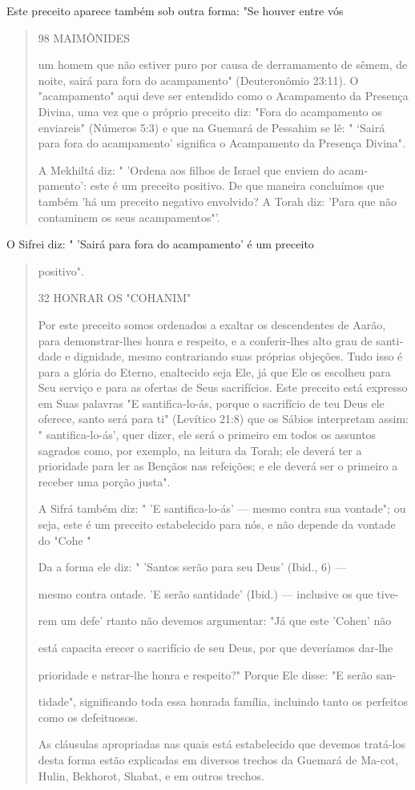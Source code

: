 Este preceito aparece também sob outra forma: "Se houver entre vós

\begin{quote}
98 MAIMÔNIDES

um homem que não estiver puro por causa de derramamento de sêmem, de
noite, sairá para fora do acampamento" (Deuteronômio 23:11). O
"acampamen­to" aqui deve ser entendido como o Acampamento da Presença
Divina, uma vez que o próprio preceito diz: "Fora do acampamento os
enviareis" (Núme­ros 5:3) e que na Guemará de Pessahim se lê: " `Sairá
para fora do acampamen­to' significa o Acampamento da Presença Divina".

A Mekhiltá diz: " 'Ordena aos filhos de Israel que enviem do
acam­pamento': este é um preceito positivo. De que maneira concluímos
que tam­bém 'há um preceito negativo envolvido? A Torah diz: 'Para que
não contami­nem os seus acampamentos"'.
\end{quote}

O Sifrei diz: " 'Sairá para fora do acampamento' é um preceito

\begin{quote}
positivo".

32 HONRAR OS "COHANIM"

Por este preceito somos ordenados a exaltar os descendentes de Aa­rão,
para demonstrar-lhes honra e respeito, e a conferir-lhes alto grau de
santi­dade e dignidade, mesmo contrariando suas próprias objeções. Tudo
isso é pa­ra a glória do Eterno, enaltecido seja Ele, já que Ele os
escolheu para Seu servi­ço e para as ofertas de Seus sacrifícios. Este
preceito está expresso em Suas pa­lavras "E santifica-lo-ás, porque o
sacrifício de teu Deus ele oferece, santo será para ti" (Levítico 21:8)
que os Sábios interpretam assim: " santifica-lo-ás', quer dizer, ele
será o primeiro em todos os assuntos sagrados como, por exemplo, na
leitura da Torah; ele deverá ter a prioridade para ler as Bençãos nas
refei­ções; e ele deverá ser o primeiro a receber uma porção justa".

A Sifrá também diz: " 'E santifica-lo-ás' --- mesmo contra sua
vonta­de"; ou seja, este é um preceito estabelecido para nós, e não
depende da von­tade do "Cohe "

Da a forma ele diz: " 'Santos serão para seu Deus' (Ibid., 6) ---

mesmo contra ontade. 'E serão santidade' (Ibid.) --- inclusive os que
tive-

rem um defe' rtanto não devemos argumentar: "Já que este 'Cohen' não

está capacita erecer o sacrifício de seu Deus, por que deveríamos
dar-lhe

prioridade e nstrar-lhe honra e respeito?" Porque Ele disse: "E serão
san-

tidade", significando toda essa honrada família, incluindo tanto os
perfeitos co­mo os defeituosos.

As cláusulas apropriadas nas quais está estabelecido que devemos
tratá-los desta forma estão explicadas em diversos trechos da Guemará de
Ma-cot, Hulin, Bekhorot, Shabat, e em outros trechos.
\end{quote}

